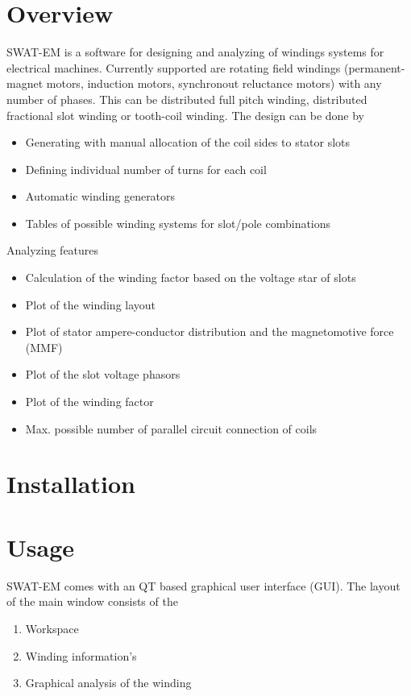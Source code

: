 \documentclass[]{scrreprt}
\begin{document}
\chapter{Overview}
SWAT-EM is a software for designing and analyzing of windings systems for electrical machines. Currently supported are rotating field windings (permanent-magnet motors, induction motors, synchronout reluctance motors) with any number of phases. This can be distributed full pitch winding, distributed fractional slot winding or tooth-coil winding. The design can be done by 
\begin{itemize}
 \item Generating with manual allocation of the coil sides to stator slots
 \item Defining individual number of turns for each coil
 \item Automatic winding generators
 \item Tables of possible winding systems for slot/pole combinations
\end{itemize}
% 
% 
% 
Analyzing features
\begin{itemize}
\item Calculation of the winding factor based on the voltage star of slots
\item Plot of the winding layout
\item Plot of stator ampere-conductor distribution and the magnetomotive force (MMF)
\item Plot of the slot voltage phasors
\item Plot of the winding factor
\item Max. possible number of parallel circuit connection of coils

\end{itemize}




\chapter{Installation}

\chapter{Usage}
%
SWAT-EM comes with an QT based graphical user interface (GUI). The layout of the main window consists of the
\begin{enumerate}
 \item Workspace
 \item Winding information's
 \item Graphical analysis of the winding
\end{enumerate}
\end{document}
